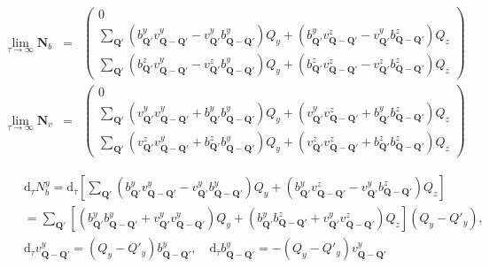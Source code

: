 \documentclass[prb,singlecolumn]{revtex4}
\begin{document}
\begin{eqnarray}
 \lim\limits_{\tau \rightarrow \infty}{\mathbf{N}_b} &=&
\left(\begin{array}{c}
 0  \\
 \sum_{\mathbf{Q}'} (b_{\mathbf{Q}'}^yv_{\mathbf{Q}-\mathbf{Q}'}^y - v_{\mathbf{Q}'}^yb_{\mathbf{Q}-\mathbf{Q}'}^y)Q_y + (b_{\mathbf{Q}'}^yv_{\mathbf{Q}-\mathbf{Q}'}^z - v_{\mathbf{Q}'}^yb_{\mathbf{Q}-\mathbf{Q}'}^z)Q_z  \\
 \sum_{\mathbf{Q}'} (b_{\mathbf{Q}'}^zv_{\mathbf{Q}-\mathbf{Q}'}^y - v_{\mathbf{Q}'}^zb_{\mathbf{Q}-\mathbf{Q}'}^y)Q_y + (b_{\mathbf{Q}'}^zv_{\mathbf{Q}-\mathbf{Q}'}^z - v_{\mathbf{Q}'}^zb_{\mathbf{Q}-\mathbf{Q}'}^z)Q_z \end{array} \right) \\
  \lim\limits_{\tau \rightarrow \infty}{\mathbf{N}_v} &=&
\left(\begin{array}{c}
 0  \\
 \sum_{\mathbf{Q}'} (v_{\mathbf{Q}'}^yv_{\mathbf{Q}-\mathbf{Q}'}^y + b_{\mathbf{Q}'}^yb_{\mathbf{Q}-\mathbf{Q}'}^y)Q_y + (v_{\mathbf{Q}'}^yv_{\mathbf{Q}-\mathbf{Q}'}^z + b_{\mathbf{Q}'}^yb_{\mathbf{Q}-\mathbf{Q}'}^z)Q_z \\
 \sum_{\mathbf{Q}'} (v_{\mathbf{Q}'}^zv_{\mathbf{Q}-\mathbf{Q}'}^y + b_{\mathbf{Q}'}^zb_{\mathbf{Q}-\mathbf{Q}'}^y)Q_y + (v_{\mathbf{Q}'}^zv_{\mathbf{Q}-\mathbf{Q}'}^z + b_{\mathbf{Q}'}^zb_{\mathbf{Q}-\mathbf{Q}'}^z)Q_z \end{array} \right)
\end{eqnarray}


\begin{eqnarray*}
&&\mathrm{d}_{\overline{\tau}}N_b^y = \mathrm{d}_{\overline{\tau}}\left[\sum_{\mathbf{Q}'} (b_{\mathbf{Q}'}^yv_{\mathbf{Q}-\mathbf{Q}'}^y - v_{\mathbf{Q}'}^yb_{\mathbf{Q}-\mathbf{Q}'}^y)Q_y + (b_{\mathbf{Q}'}^yv_{\mathbf{Q}-\mathbf{Q}'}^z - v_{\mathbf{Q}'}^yb_{\mathbf{Q}-\mathbf{Q}'}^z)Q_z \right] \\
&& =\sum_{\mathbf{Q}'} [(b_{\mathbf{Q}'}^yb_{\mathbf{Q}-\mathbf{Q}'}^y + v_{\mathbf{Q}'}^yv_{\mathbf{Q}-\mathbf{Q}'}^y)Q_y + (b_{\mathbf{Q}'}^yb_{\mathbf{Q}-\mathbf{Q}'}^z + v_{\mathbf{Q}'}^yv_{\mathbf{Q}-\mathbf{Q}'}^z)Q_z](Q_y-Q'_y) ,  \\
&&\mathrm{d}_{\overline{\tau}} v_{\mathbf{Q}-\mathbf{Q}'}^y = (Q_y-Q'_y)b_{\mathbf{Q}-\mathbf{Q}'}^y,\quad \mathrm{d}_{\overline{\tau}} b_{\mathbf{Q}-\mathbf{Q}'}^y = -(Q_y-Q'_y)v_{\mathbf{Q}-\mathbf{Q}'}^y \nonumber
\end{eqnarray*}
  
\end{document}

